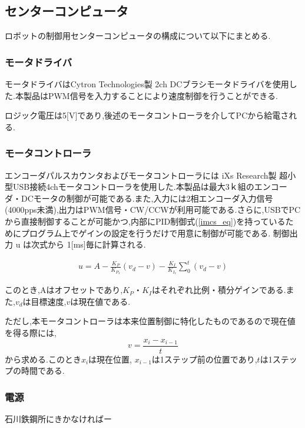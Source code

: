 \subsection{センターコンピュータ}
\par ロボットの制御用センターコンピュータの構成について以下にまとめる.
\subsubsection{モータドライバ}

\par モータドライバはCytron Technologies製 2ch DCブラシモータドライバを使用した.本製品はPWM信号を入力することにより速度制御を行うことができる.\\
\par ロジック電圧は5[V]であり,後述のモータコントローラを介してPCから給電される.

\subsubsection{モータコントローラ}
\par エンコーダパルスカウンタおよびモータコントローラには iXs Research製 超小型USB接続4chモータコントローラを使用した.本製品は最大3ｋ組のエンコーダ・DCモータの制御が可能である.また,入力には2相エンコーダ入力信号(4000pps未満),出力はPWM信号・CW/CCWが利用可能である.さらに,USBでPCから直接制御することが可能かつ,内部にPID制御式(\ref{imcs_eq})を持っているためにプログラム上でゲインの設定を行うだけで用意に制御が可能である.
制御出力 u は次式から 1[ms]毎に計算される.

\begin{eqnarray}
	u=A-\frac{K_P}{K_{P_x}}(v_d - v)%
	-\frac{K_I}{K_{I_v}}\sum_0^t (v_d-v)
\label{imcs_eq}
\end{eqnarray}

このとき,Aはオフセットであり,$K_P・K_I$はそれぞれ比例・積分ゲインである.また,$v_d$は目標速度,$v$は現在値である.\\
\par ただし,本モータコントローラは本来位置制御に特化したものであるので現在値を得る際には,
\begin{equation}
	v = \frac{x_i - x_{i-1}}{t}
\end{equation}
から求める.このとき$x_i$は現在位置, $x_{i-1}$は1ステップ前の位置であり,$t$は1ステップの時間である.

\subsubsection{電源}
石川鉄鋼所にきかなければー
